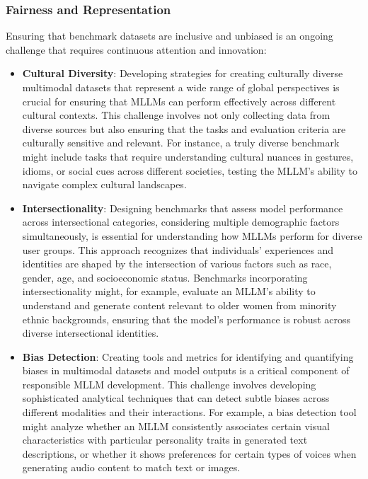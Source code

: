 \subsubsection{Fairness and Representation}
Ensuring that benchmark datasets are inclusive and unbiased is an ongoing challenge that requires continuous attention and innovation:

\begin{itemize}
    \item \textbf{Cultural Diversity}: Developing strategies for creating culturally diverse multimodal datasets that represent a wide range of global perspectives is crucial for ensuring that MLLMs can perform effectively across different cultural contexts. This challenge involves not only collecting data from diverse sources but also ensuring that the tasks and evaluation criteria are culturally sensitive and relevant. For instance, a truly diverse benchmark might include tasks that require understanding cultural nuances in gestures, idioms, or social cues across different societies, testing the MLLM's ability to navigate complex cultural landscapes.

    \item \textbf{Intersectionality}: Designing benchmarks that assess model performance across intersectional categories, considering multiple demographic factors simultaneously, is essential for understanding how MLLMs perform for diverse user groups. This approach recognizes that individuals' experiences and identities are shaped by the intersection of various factors such as race, gender, age, and socioeconomic status. Benchmarks incorporating intersectionality might, for example, evaluate an MLLM's ability to understand and generate content relevant to older women from minority ethnic backgrounds, ensuring that the model's performance is robust across diverse intersectional identities.

    \item \textbf{Bias Detection}: Creating tools and metrics for identifying and quantifying biases in multimodal datasets and model outputs is a critical component of responsible MLLM development. This challenge involves developing sophisticated analytical techniques that can detect subtle biases across different modalities and their interactions. For example, a bias detection tool might analyze whether an MLLM consistently associates certain visual characteristics with particular personality traits in generated text descriptions, or whether it shows preferences for certain types of voices when generating audio content to match text or images.
\end{itemize}

